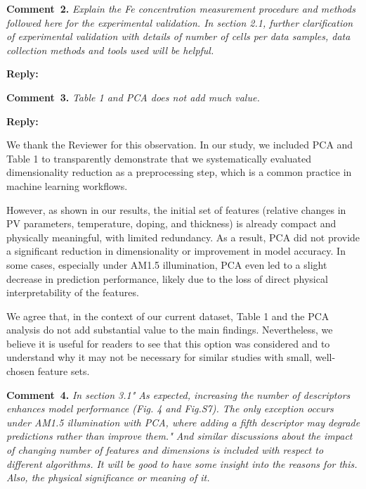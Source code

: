 \documentclass[a4paper,fleqn]{cas-sc}
\begin{document}
\vspace{1cm}
\noindent
\textcolor[rgb]{0.00,0.50,1.00}{\textbf{Comment~2.}}
\emph{Explain the Fe concentration measurement procedure and methods followed here for the experimental validation. In section 2.1, further clarification of experimental validation with details of number of cells per data samples, data collection methods and tools used will be helpful.}

\noindent
\textcolor[rgb]{0.51,0.00,0.00}{\textbf{Reply:}}


\vspace{1cm}
\noindent
\textcolor[rgb]{0.00,0.50,1.00}{\textbf{Comment~3.}}
\emph{Table 1 and PCA does not add much value.}

\noindent
\textcolor[rgb]{0.51,0.00,0.00}{\textbf{Reply:}}

We thank the Reviewer for this observation. In our study, we included PCA and Table 1 to transparently demonstrate that we systematically evaluated dimensionality reduction as a preprocessing step, which is a common practice in machine learning workflows.

However, as shown in our results, the initial set of features (relative changes in PV parameters, temperature, doping, and thickness) is already compact and physically meaningful, with limited redundancy. 
As a result, PCA did not provide a significant reduction in dimensionality or improvement in model accuracy. In some cases, especially under AM1.5 illumination, PCA even led to a slight decrease in prediction performance, likely due to the loss of direct physical interpretability of the features.

We agree that, in the context of our current dataset, Table 1 and the PCA analysis do not add substantial value to the main findings. 
Nevertheless, we believe it is useful for readers to see that this option was considered and to understand why it may not be necessary for similar studies with small, well-chosen feature sets.



\vspace{1cm}
\noindent
\textcolor[rgb]{0.00,0.50,1.00}{\textbf{Comment~4.}}
\emph{In section 3.1" As expected, increasing the number of descriptors enhances model performance (Fig. 4 and Fig.S7). The only exception occurs under AM1.5 illumination with PCA, where adding a fifth descriptor may degrade predictions rather than improve them." And similar discussions about the impact of changing number of features and dimensions is included with respect to different algorithms.  It will be good to have some insight into the reasons for this. Also, the physical significance or meaning of it.}
\end{document}
